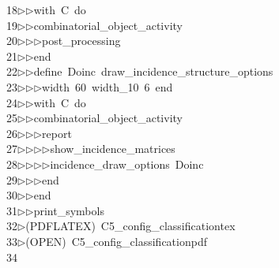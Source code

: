 \begin{tabbing}
18\>$\triangleright$\>$\triangleright$\>with\ C\ do\ \\[0pt]
19\>$\triangleright$\>$\triangleright$\>combinatorial\_object\_activity\ \\[0pt]
20\>$\triangleright$\>$\triangleright$\>$\triangleright$\>post\_processing\ \\[0pt]
21\>$\triangleright$\>$\triangleright$\>end\ \\[0pt]
22\>$\triangleright$\>$\triangleright$\>define\ Doinc\ draw\_incidence\_structure\_options\ \\[0pt]
23\>$\triangleright$\>$\triangleright$\>$\triangleright$\>width\ 60\ width\_10\ 6\ end\ \\[0pt]
24\>$\triangleright$\>$\triangleright$\>with\ C\ do\ \\[0pt]
25\>$\triangleright$\>$\triangleright$\>combinatorial\_object\_activity\ \\[0pt]
26\>$\triangleright$\>$\triangleright$\>$\triangleright$\>report\ \\[0pt]
27\>$\triangleright$\>$\triangleright$\>$\triangleright$\>$\triangleright$\>show\_incidence\_matrices\ \\[0pt]
28\>$\triangleright$\>$\triangleright$\>$\triangleright$\>$\triangleright$\>incidence\_draw\_options\ Doinc\ \\[0pt]
29\>$\triangleright$\>$\triangleright$\>$\triangleright$\>end\ \\[0pt]
30\>$\triangleright$\>$\triangleright$\>end\ \\[0pt]
31\>$\triangleright$\>$\triangleright$\>print\_symbols\\[0pt]
32\>$\triangleright$\>(PDFLATEX)\ C5\_config\_classificationtex\\[0pt]
33\>$\triangleright$\>(OPEN)\ C5\_config\_classificationpdf\\[0pt]
34\>\end{tabbing}
